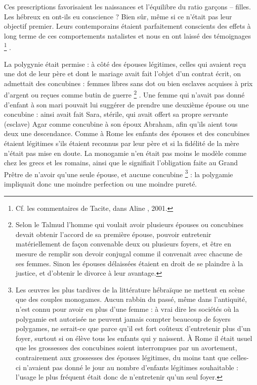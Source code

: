  Ces prescriptions favorisaient les naissances et l'équilibre du ratio garçons -- filles. Les hébreux en ont-ils eu conscience ? Bien sûr, même si ce n'était pas leur objectif premier. Leurs contemporains étaient parfaitement conscients des effets à long terme de ces comportements natalistes et nous en ont laissé des témoignages%
\footnote{Cf. les commentaires de Tacite, dans Aline , 2001.}%
.

 La polygynie était permise : à côté des épouses légitimes, celles qui avaient reçu une dot de leur père et dont le mariage avait fait l'objet d'un contrat écrit, on admettait des concubines : femmes libres sans dot ou bien esclaves acquises à prix d'argent ou reçues comme butin de guerre%
\footnote{Selon le Talmud l'homme qui voulait avoir plusieurs épouses ou concubines devait obtenir l'accord de sa première épouse, pouvoir entretenir matériellement de façon convenable deux ou plusieurs foyers, et être en mesure de remplir son devoir conjugal comme il convenait avec chacune de ses femmes. Sinon les épouses délaissées étaient en droit de se plaindre à la justice, et d'obtenir le divorce à leur avantage.}%
. Une femme qui n'avait pas donné d'enfant à son mari pouvait lui suggérer de prendre une deuxième épouse ou une concubine : ainsi avait fait Sara, stérile, qui avait offert sa propre servante (esclave) Agar comme concubine à son époux Abraham, afin qu'ils aient tous deux une descendance. Comme à Rome les enfants des épouses et des concubines étaient légitimes s'ils étaient reconnus par leur père et si la fidélité de la mère n'était pas mise en doute. La monogamie n'en était pas moins le modèle comme chez les grecs et les romains, ainsi que le signifiait l'obligation faite au Grand Prêtre de n'avoir qu'une seule épouse, et aucune concubine%
\footnote{Les œuvres les plus tardives de la littérature hébraïque ne mettent en scène que des couples monogames. Aucun rabbin du passé, même dans l'antiquité, n'est connu pour avoir eu plus d'une femme : à vrai dire les sociétés où la polygamie est autorisée ne peuvent jamais compter beaucoup de foyers polygames, ne serait-ce que parce qu'il est fort coûteux d'entretenir plus d'un foyer, surtout si on élève tous les enfants qui y naissent. À Rome il était usuel que les grossesses des concubines soient interrompues par un avortement, contrairement aux grossesses des épouses légitimes, du moins tant que celles-ci n'avaient pas donné le jour au nombre d'enfants légitimes souhaitable : l'usage le plus fréquent était donc de n'entretenir qu'un seul foyer.}%
 : la polygamie impliquait donc une moindre perfection ou une moindre pureté.

